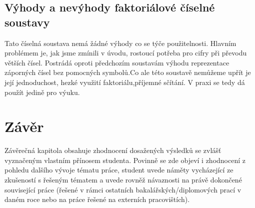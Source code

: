 \documentclass[czech,bachelor,dept470,male]{diploma}
\begin{document}
\subsection{Výhody a nevýhody faktoriálové číselné soustavy} Tato číselná soustava nemá žádné výhody co se týče použitelnosti. Hlavním problémem je, jak jsme zmínili v úvodu, rostoucí potřeba pro cifry při převodu větších čísel. Postrádá oproti předchozím soustavám výhodu reprezentace záporných čísel bez pomocných symbolů.\newline Co ale této soustavě nemůžeme upřít je její jednoduchost, hezké využití faktoriálu,\newline příjemné sčítání. V praxi se tedy dá použít jedině pro výuku.
\section{Závěr} Závěrečná kapitola obsahuje zhodnocení dosažených výsledků se zvlášť vyznačeným vlastním přínosem studenta. Povinně se zde objeví i zhodnocení z pohledu dalšího vývoje tématu práce, student uvede náměty vycházející ze zkušeností s řešeným
tématem a uvede rovněž návaznosti na právě dokončené související práce (řešené v rámci ostatních bakalářských/diplomových
prací v daném roce nebo na práce řešené na externích pracovištích).
\printbibliography[title={Literatura}, heading=bibintoc]
\end{document}
